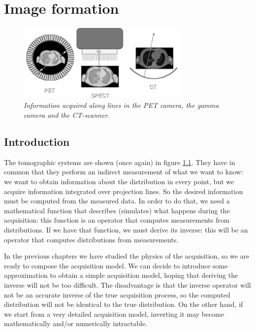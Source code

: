 \chapter{Image formation}  \label{ch:image_formation}

%
%
%
\begin{figure}[tb]
\centering
\includegraphics[width=0.75\textwidth]{figs/fig_spect_pet_ct.pdf}
\caption{\label{fig:spect_pet_ct_bis} \emph{Information acquired along lines
in the PET camera, the gamma camera and the CT-scanner.}}
\end{figure}

\section{Introduction}
The tomographic systems are shown (once again) in figure
\ref{fig:spect_pet_ct_bis}. They have in common that they perform an indirect
measurement of what we want to know: we want to obtain information about the
distribution in every point, but we acquire information integrated over
projection lines. So the desired information must be computed from the
measured data. In order to do that, we need a mathematical function that
describes (simulates) what happens during the acquisition: this function is an
operator that computes measurements from distributions. If we have that
function, we must derive its inverse: this will be an operator that computes
distributions from measurements.

In the previous chapters we have studied the physics of the acquisition, so we
are ready to compose the acquisition model. We can decide to introduce some
approximation to obtain a simple acquisition model, hoping that deriving the
inverse will not be too difficult. The disadvantage is that the inverse
operator will not be an accurate inverse of the true acquisition process, so
the computed distribution will not be identical to the true distribution. On
the other hand, if we start from a very detailed acquisition model, inverting
it may become mathematically and/or numerically intractable.

